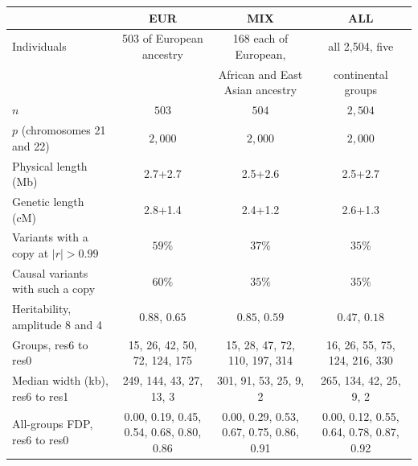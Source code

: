 \begin{tabular}{lccc}
\toprule
 & EUR & MIX & ALL\\
\midrule
Individuals & 503 of European ancestry & 168 each of European, & all 2{,}504, five\\
 &  & African and East Asian ancestry & continental groups\\
$n$ & $503$ & $504$ & $2{,}504$\\
$p$ (chromosomes 21 and 22) & $2{,}000$ & $2{,}000$ & $2{,}000$\\
Physical length (Mb) & 2.7+2.7 & 2.5+2.6 & 2.5+2.7\\
Genetic length (cM) & 2.8+1.4 & 2.4+1.2 & 2.6+1.3\\
Variants with a copy at $|r|>0.99$ & $59\%$ & $37\%$ & $35\%$\\
Causal variants with such a copy & $60\%$ & $35\%$ & $35\%$\\
Heritability, amplitude 8 and 4 & $0.88$, $0.65$ & $0.85$, $0.59$ & $0.47$, $0.18$\\
Groups, res6 to res0 & 15, 26, 42, 50, 72, 124, 175 & 15, 28, 47, 72, 110, 197, 314 & 16, 26, 55, 75, 124, 216, 330\\
Median width (kb), res6 to res1 & 249, 144, 43, 27, 13, 3 & 301, 91, 53, 25, 9, 2 & 265, 134, 42, 25, 9, 2\\
All-groups FDP, res6 to res0 & 0.00, 0.19, 0.45, 0.54, 0.68, 0.80, 0.86 & 0.00, 0.29, 0.53, 0.67, 0.75, 0.86, 0.91 & 0.00, 0.12, 0.55, 0.64, 0.78, 0.87, 0.92\\
\bottomrule
\end{tabular}

